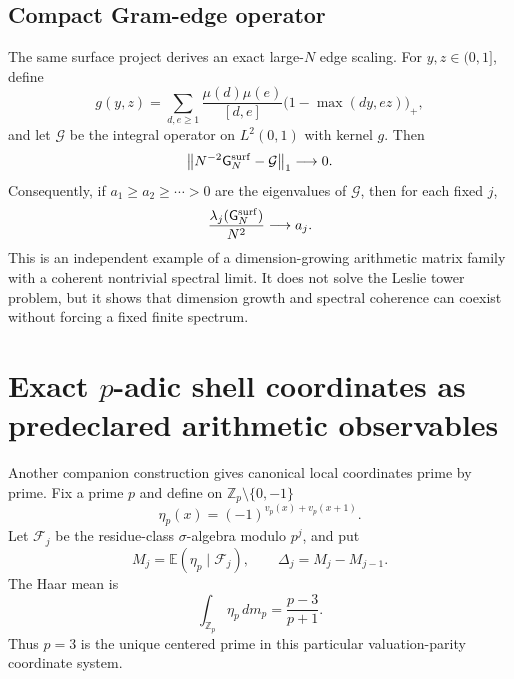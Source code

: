 \documentclass[11pt]{amsart}
\numberwithin{equation}{section}
\theoremstyle{plain}
\theoremstyle{definition}
\theoremstyle{remark}
\begin{document}
\subsection{Compact Gram-edge operator}

The same surface project derives an exact large-$N$ edge scaling.  For
$y,z\in(0,1]$, define
\begin{equation}
g(y,z)
=
\sum_{d,e\ge1}
\frac{\mu(d)\mu(e)}{[d,e]}
\bigl(1-\max(dy,ez)\bigr)_+,
\label{eq:v9_surface_limit_kernel}
\end{equation}
and let $\mathcal G$ be the integral operator on $L^2(0,1)$ with kernel $g$.  Then
\begin{equation}
\left\|
N^{-2}\mathsf G_N^{\rm surf}-\mathcal G
\right\|_1
\longrightarrow0.
\label{eq:v9_surface_trace_norm_limit}
\end{equation}
Consequently, if $a_1\ge a_2\ge\cdots>0$ are the eigenvalues of $\mathcal G$, then for each
fixed $j$,
\begin{equation}
\frac{\lambda_j(\mathsf G_N^{\rm surf})}{N^2}
\longrightarrow a_j.
\label{eq:v9_surface_edge_eigenvalues}
\end{equation}
This is an independent example of a dimension-growing arithmetic matrix family with a coherent
nontrivial spectral limit.  It does not solve the Leslie tower problem, but it shows that
dimension growth and spectral coherence can coexist without forcing a fixed finite spectrum.

\section{Exact $p$-adic shell coordinates as predeclared arithmetic observables}
\label{sec:v9_padic_shell_import}

Another companion construction gives canonical local coordinates prime by prime.  Fix a prime
$p$ and define on $\mathbb Z_p\setminus\{0,-1\}$
\begin{equation}
\eta_p(x)
=
(-1)^{v_p(x)+v_p(x+1)}.
\label{eq:v9_eta_p}
\end{equation}
Let $\mathcal F_j$ be the residue-class $\sigma$-algebra modulo $p^j$, and put
\[
M_j=\mathbb E(\eta_p\mid\mathcal F_j),
\qquad
\Delta_j=M_j-M_{j-1}.
\]
The Haar mean is
\begin{equation}
\boxed{
\int_{\mathbb Z_p}\eta_p\,dm_p
=
\frac{p-3}{p+1}.
}
\label{eq:v9_padic_mean}
\end{equation}
Thus $p=3$ is the unique centered prime in this particular valuation-parity coordinate system.
\end{document}
